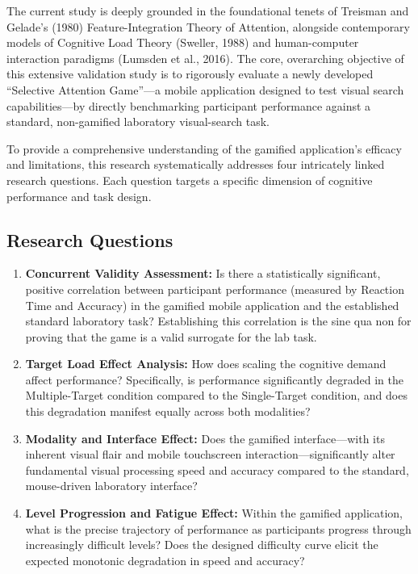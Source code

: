 \documentclass[11pt,a4paper]{article}
\begin{document}
The current study is deeply grounded in the foundational tenets of Treisman and Gelade's (1980) Feature-Integration Theory of Attention, alongside contemporary models of Cognitive Load Theory (Sweller, 1988) and human-computer interaction paradigms (Lumsden et al., 2016). The core, overarching objective of this extensive validation study is to rigorously evaluate a newly developed ``Selective Attention Game''---a mobile application designed to test visual search capabilities---by directly benchmarking participant performance against a standard, non-gamified laboratory visual-search task.

To provide a comprehensive understanding of the gamified application's efficacy and limitations, this research systematically addresses four intricately linked research questions. Each question targets a specific dimension of cognitive performance and task design.

\subsection{Research Questions}
\begin{enumerate}[label=\textbf{RQ\arabic*:}, leftmargin=*]
    \item \textbf{Concurrent Validity Assessment:} Is there a statistically significant, positive correlation between participant performance (measured by Reaction Time and Accuracy) in the gamified mobile application and the established standard laboratory task? Establishing this correlation is the sine qua non for proving that the game is a valid surrogate for the lab task.
    \item \textbf{Target Load Effect Analysis:} How does scaling the cognitive demand affect performance? Specifically, is performance significantly degraded in the Multiple-Target condition compared to the Single-Target condition, and does this degradation manifest equally across both modalities?
    \item \textbf{Modality and Interface Effect:} Does the gamified interface---with its inherent visual flair and mobile touchscreen interaction---significantly alter fundamental visual processing speed and accuracy compared to the standard, mouse-driven laboratory interface? 
    \item \textbf{Level Progression and Fatigue Effect:} Within the gamified application, what is the precise trajectory of performance as participants progress through increasingly difficult levels? Does the designed difficulty curve elicit the expected monotonic degradation in speed and accuracy?
\end{enumerate}
\end{document}
